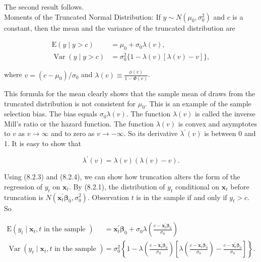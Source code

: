 \documentclass[10pt]{article}
\begin{document}
The second result follows.\\
Moments of the Truncated Normal Distribution: If $y \sim N\left(\mu_{0}, \sigma_{0}^{2}\right)$ and $c$ is a constant, then the mean and the variance of the truncated distribution are


\begin{align*}
\mathrm{E}(y \mid y>c) & =\mu_{0}+\sigma_{0} \lambda(v),  \tag{8.2.3}\\
\operatorname{Var}(y \mid y>c) & =\sigma_{0}^{2}\{1-\lambda(v)[\lambda(v)-v]\}, \tag{8.2.4}
\end{align*}


where $v=\left(c-\mu_{0}\right) / \sigma_{0}$ and $\lambda(v) \equiv \frac{\phi(v)}{1-\Phi(v)}$.

This formula for the mean clearly shows that the sample mean of draws from the truncated distribution is not consistent for $\mu_{0}$. This is an example of the sample selection bias. The bias equals $\sigma_{0} \lambda(v)$. The function $\lambda(v)$ is called the inverse Mill's ratio or the hazard function. The function $\lambda(v)$ is convex and asymptotes to $v$ as $v \rightarrow \infty$ and to zero as $v \rightarrow-\infty$. So its derivative $\lambda^{\prime}(v)$ is between 0 and 1. It is easy to show that


\begin{equation*}
\lambda^{\prime}(v)=\lambda(v)(\lambda(v)-v) . \tag{8.2.5}
\end{equation*}


Using (8.2.3) and (8.2.4), we can show how truncation alters the form of the regression of $y_{t}$ on $\mathbf{x}_{t}$. By (8.2.1), the distribution of $y_{t}$ conditional on $\mathbf{x}_{t}$ before truncation is $N\left(\mathbf{x}_{t}^{\prime} \boldsymbol{\beta}_{0}, \sigma_{0}^{2}\right)$. Observation $t$ is in the sample if and only if $y_{t}>c$. So


\begin{align*}
\mathrm{E}\left(y_{t} \mid \mathbf{x}_{t}, t \text { in the sample }\right) & =\mathbf{x}_{t}^{\prime} \boldsymbol{\beta}_{0}+\sigma_{0} \lambda\left(\frac{c-\mathbf{x}_{t}^{\prime} \boldsymbol{\beta}_{0}}{\sigma_{0}}\right)  \tag{8.2.6}\\
\operatorname{Var}\left(y_{t} \mid \mathbf{x}_{t}, t \text { in the sample }\right) & =\sigma_{0}^{2}\left\{1-\lambda\left(\frac{c-\mathbf{x}_{t}^{\prime} \boldsymbol{\beta}_{0}}{\sigma_{0}}\right)\left[\lambda\left(\frac{c-\mathbf{x}_{t}^{\prime} \boldsymbol{\beta}_{0}}{\sigma_{0}}\right)-\frac{c-\mathbf{x}_{t}^{\prime} \boldsymbol{\beta}_{0}}{\sigma_{0}}\right]\right\} . \tag{8.2.7}
\end{align*}
\end{document}
